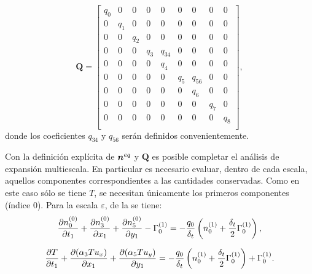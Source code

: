 \begin{equation}
	\bm{Q}=
	\begin{bmatrix}
	q_0 & 0 & 0 & 0 & 0 & 0 & 0 & 0 & 0 \\
	0 & q_1 & 0 & 0 & 0 & 0 & 0 & 0 & 0 \\
	0 & 0 & q_2 & 0 & 0 & 0 & 0 & 0 & 0 \\
	0 & 0 & 0 & q_3 & q_{34} & 0 & 0 & 0 & 0 \\
	0 & 0 & 0 & 0 & q_4 & 0 & 0 & 0 & 0 \\
	0 & 0 & 0 & 0 & 0 & q_5 & q_{56} & 0 & 0 \\
	0 & 0 & 0 & 0 & 0 & 0 & q_6 & 0 & 0 \\
	0 & 0 & 0 & 0 & 0 & 0 & 0 & q_7 & 0 \\
	0 & 0 & 0 & 0 & 0 & 0 & 0 & 0 & q_8 \\
	\end{bmatrix},
\end{equation} 
\FloatBarrier
donde los coeficientes $q_{34}$ y $q_{56}$ ser\'an definidos convenientemente.  

Con la definici\'on expl\'icita de $\bm{n}^{eq}$ y $\bm{Q}$ es posible completar el an\'alisis de expansi\'on multiescala. En particular es necesario evaluar, dentro de cada escala, aquellos componentes correspondientes a las cantidades conservadas. Como en este caso s\'olo se tiene $T$, se necesitan \'unicamente los primeros componentes (\'indice 0). Para la escala $\varepsilon$, de la  se tiene:
\begin{equation}
	\dfrac{ \partial n_{0}^{(0)}}{\partial t_1}  +  \dfrac{ \partial n_{3}^{(0)}}{\partial x_1} + \dfrac{ \partial n_{5}^{(0)}}{\partial y_1} - \Gamma_0^{(1)}= -\dfrac{q_0}{\delta_t} \left( n_{0}^{(1)} + \dfrac{\delta_t}{2} \Gamma_0^{(1)} \right),
\end{equation}

\begin{equation}
	\dfrac{ \partial T}{\partial t_1}  +  \dfrac{ \partial (\alpha_3 T u_x)}{\partial x_1} + \dfrac{ \partial (\alpha_5 T u_y)}{\partial y_1} = -\dfrac{q_0}{\delta_t} \left( n_{0}^{(1)} + \dfrac{\delta_t}{2} \Gamma_0^{(1)} \right) + \Gamma_0^{(1)}.
	\label{eq:T_eps_1}
\end{equation}

